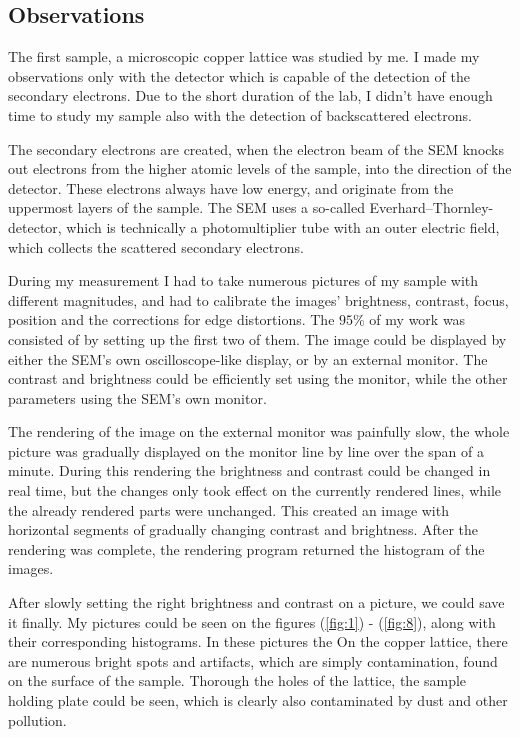 \begin{multicols}{2}
\section{Observations}
The first sample, a microscopic copper lattice was studied by me. I made my observations only with the detector which is capable of the detection of the secondary electrons. Due to the short duration of the lab, I didn't have enough time to study my sample also with the detection of backscattered electrons. \par
The secondary electrons are created, when the electron beam of the SEM knocks out electrons from the higher atomic levels of the sample, into the direction of the detector. These electrons always have low energy, and originate from the uppermost layers of the sample. The SEM uses a so-called Everhard--Thornley-detector, which is technically a photomultiplier tube with an outer electric field, which collects the scattered secondary electrons. \par
During my measurement I had to take numerous pictures of my sample with different magnitudes, and had to calibrate the images' brightness, contrast, focus, position and the corrections for edge distortions. The $95\%$ of my work was consisted of by setting up the first two of them. The image could be displayed by either the SEM's own oscilloscope-like display, or by an external monitor. The contrast and brightness could be efficiently set using the monitor, while the other parameters using the SEM's own monitor. \par
The rendering of the image on the external monitor was painfully slow, the whole picture was gradually displayed on the monitor line by line over the span of a minute. During this rendering the brightness and contrast could be changed in real time, but the changes only took effect on the currently rendered lines, while the already rendered parts were unchanged. This created an image with horizontal segments of gradually changing contrast and brightness. After the rendering was complete, the rendering program returned the histogram of the images. \par
After slowly setting the right brightness and contrast on a picture, we could save it finally. My pictures could be seen on the figures (\ref{fig:1}) - (\ref{fig:8}), along with their corresponding histograms. In these pictures the  On the copper lattice, there are numerous bright spots and artifacts, which are simply contamination, found on the surface of the sample. Thorough the holes of the lattice, the sample holding plate could be seen, which is clearly also contaminated by dust and other pollution. \par

\end{multicols}
